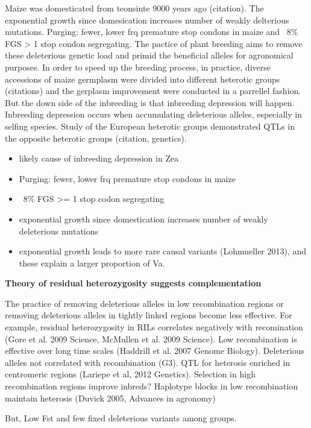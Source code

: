 \documentclass[10pt]{article}
\begin{document}
Maize was domesticated from teonsinte 9000 years ago (citation). The exponential growth since domesication increases number of weakly delterious mutations. Purging: fewer, lower frq premature stop condons in maize and ~8\% FGS > 1 stop condon segregating. The pactice of plant breeding aims to remove these deleterious genetic load and primid the beneficial alleles for agronomical purposes. In order to speed up the breeding process, in practice, diverse accessions of maize germplasm were divided into different heterotic groups (citations) and the gerplasm improvement were conducted in a parrellel fashion. But the down side of the inbreeding is that inbreeding depression will happen. Inbreeding depression occurs when accumulating deleterious alleles, especially in selfing species. Study of the European heterotic groups demonstrated QTLs in the opposite heterotic groups (citation, genetics).    

\begin{itemize}
  \item likely cause of inbreeding depression in Zea
  \item Purging: fewer, lower frq premature stop condons in maize
  \item ~8\% FGS >= 1 stop codon segregating
  \item exponential growth since domestication increases number of weakly deleterious mutations
  \item exponential growth leads to more rare causal variants (Lohmueller 2013), and these explain a larger proportion of Va.
\end{itemize}



\textbf{Theory of residual heterozygosity suggests complementation} 

The practice of removing deleterious alleles in low recombination regions or removing deleterious alleles in tightly linked regions become less effective. For example, residual heterozygosity in RILs correlates negatively with recomination (Gore et al. 2009 Science, McMullen et al. 2009 Science). Low recombination is effective over long time scales (Haddrill et al. 2007 Genome Biology). Deleterious alleles not correlated with recombination (G3). QTL for heterosis enriched in centromeric regions (Lariepe et al, 2012 Genetics).
Selection in high recombination regions improve inbreds?
Haplotype blocks in low recombination maintain heterosis (Duvick 2005, Advances in agronomy)


But, Low Fst and few fixed deleterious variants among groups. 
\end{document}

